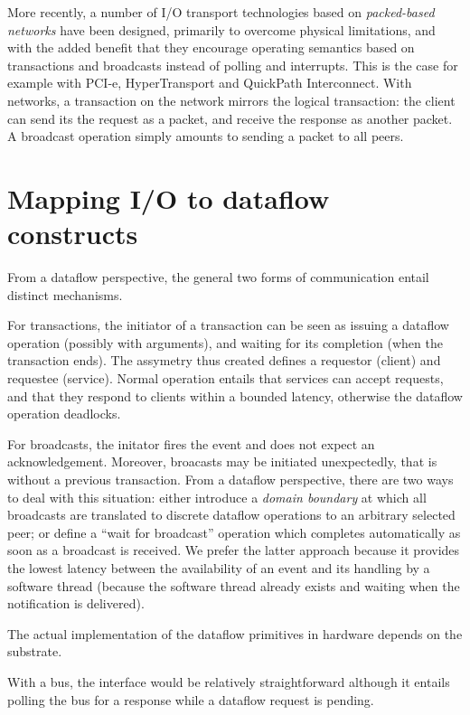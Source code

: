 More recently, a number of I/O transport technologies based on
\emph{packed-based networks} have been designed, primarily to overcome
physical limitations, and with the added benefit that they encourage
operating semantics based on transactions and broadcasts instead of
polling and interrupts. This is the case for example with PCI-e,
HyperTransport and QuickPath Interconnect. With networks, a
transaction on the network mirrors the logical transaction: the client
can send its the request as a packet, and receive the response as
another packet. A broadcast operation simply amounts to sending a
packet to all peers.

\section{Mapping I/O to dataflow constructs}

From a dataflow perspective, the general two forms of communication entail
distinct mechanisms. 

For transactions, the initiator of a transaction
can be seen as issuing a dataflow operation (possibly with arguments),
and waiting for its completion (when the transaction ends). The
assymetry thus created defines a requestor (client) and requestee
(service). Normal operation entails that services can accept requests,
and that they respond to clients within a bounded latency, otherwise
the dataflow operation deadlocks.

For broadcasts, the initator fires the event and does not expect an
acknowledgement. Moreover, broacasts may be initiated unexpectedly,
that is without a previous transaction. From a dataflow perspective,
there are two ways to deal with this situation: either introduce a
\emph{domain boundary} at which all broadcasts are translated to
discrete dataflow operations to an arbitrary selected peer; or define
a ``wait for broadcast'' operation which completes automatically as
soon as a broadcast is received. We prefer the latter approach because
it provides the lowest latency between the availability of an event
and its handling by a software thread (because the software thread
already exists and waiting when the notification is delivered).

The actual implementation of the dataflow primitives in hardware
depends on the substrate. 

With a bus, the interface would be relatively straightforward although
it entails polling the bus for a response while a dataflow request is
pending.

